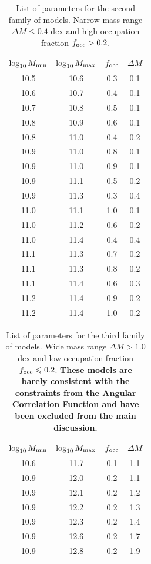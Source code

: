 \documentclass[usenatbib]{mn2e}
\begin{document}
\begin{table}
\begin{center}
\begin{tabular}{cccc}\hline\hline
$\log_{10}M_{\rm min}$ & $\log_{10}M_{\rm max}$ & $f_{\rm occ}$ & $\Delta M$\\\hline
 10.5 &10.6 & 0.3 & 0.1 \\
 10.6 &10.7 & 0.4 & 0.1 \\
 10.7 &10.8 & 0.5 & 0.1 \\
 10.8 &10.9 & 0.6 & 0.1 \\
 10.8 &11.0 & 0.4 & 0.2 \\
 10.9 &11.0 & 0.8 & 0.1 \\
 10.9 &11.0 & 0.9 & 0.1 \\
 10.9 &11.1 & 0.5 & 0.2 \\
 10.9 &11.3 & 0.3 & 0.4 \\
 11.0 &11.1 & 1.0 & 0.1 \\
 11.0 &11.2 & 0.6 & 0.2 \\
 11.0 &11.4 & 0.4 & 0.4 \\
 11.1 &11.3 & 0.7 & 0.2 \\
 11.1 &11.3 & 0.8 & 0.2 \\
 11.1 &11.4 & 0.6 & 0.3 \\
 11.2 &11.4 & 0.9 & 0.2 \\
 11.2 &11.4 & 1.0 & 0.2 \\\hline
\end{tabular}
\end{center}
\caption{\label{table:secondfamily}List of parameters for the second
  family of models. Narrow mass range $\Delta M\leq 0.4 $ dex and high occupation fraction $f_{\rm occ}>0.2$.}
\end{table}


\begin{table}
\begin{center}
\begin{tabular}{cccc}\hline\hline
$\log_{10}M_{\rm min}$ & $\log_{10}M_{\rm max}$ & $f_{\rm occ}$ & $\Delta M$\\\hline
 10.6 &11.7 & 0.1& 1.1 \\
 10.9 &12.0 & 0.2& 1.1 \\
 10.9 &12.1 & 0.2& 1.2 \\
 10.9 &12.2 & 0.2& 1.3 \\
 10.9 &12.3 & 0.2& 1.4 \\
 10.9 &12.6 & 0.2& 1.7 \\
 10.9 &12.8 & 0.2& 1.9 \\\hline
\end{tabular}
\end{center}
\caption{\label{table:thirdfamily}List of parameters for the third
  family of models. Wide mass range $\Delta M> 1.0$ dex and low
  occupation fraction $f_{\rm occ}\leq 0.2$. {\bf These models are barely
  consistent with the constraints from the Angular Correlation
  Function and have been excluded from the main discussion.}} 
\end{table}
\end{document}
